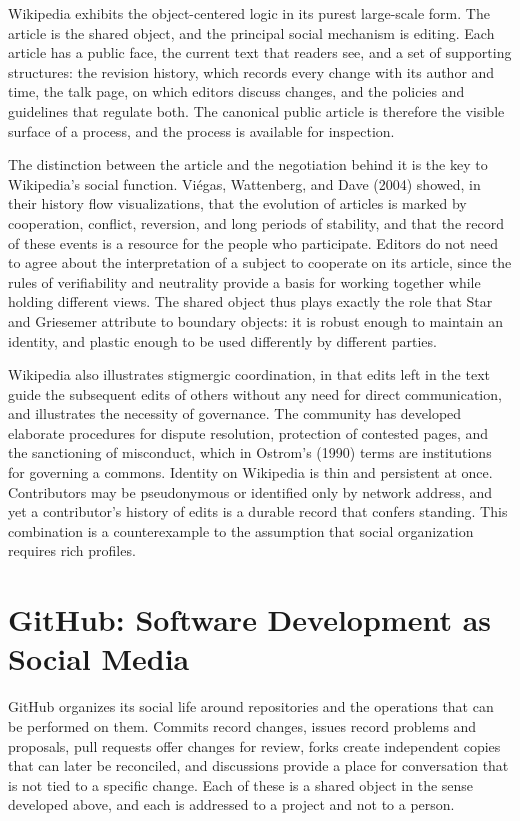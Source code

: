 \documentclass[11pt]{article}
\theoremstyle{remark}
\begin{document}
Wikipedia exhibits the object-centered logic in its purest large-scale form. The article is the shared object, and the principal social mechanism is editing. Each article has a public face, the current text that readers see, and a set of supporting structures: the revision history, which records every change with its author and time, the talk page, on which editors discuss changes, and the policies and guidelines that regulate both. The canonical public article is therefore the visible surface of a process, and the process is available for inspection.

The distinction between the article and the negotiation behind it is the key to Wikipedia's social function. Viégas, Wattenberg, and Dave (2004) showed, in their history flow visualizations, that the evolution of articles is marked by cooperation, conflict, reversion, and long periods of stability, and that the record of these events is a resource for the people who participate. Editors do not need to agree about the interpretation of a subject to cooperate on its article, since the rules of verifiability and neutrality provide a basis for working together while holding different views. The shared object thus plays exactly the role that Star and Griesemer attribute to boundary objects: it is robust enough to maintain an identity, and plastic enough to be used differently by different parties.

Wikipedia also illustrates stigmergic coordination, in that edits left in the text guide the subsequent edits of others without any need for direct communication, and illustrates the necessity of governance. The community has developed elaborate procedures for dispute resolution, protection of contested pages, and the sanctioning of misconduct, which in Ostrom's (1990) terms are institutions for governing a commons. Identity on Wikipedia is thin and persistent at once. Contributors may be pseudonymous or identified only by network address, and yet a contributor's history of edits is a durable record that confers standing. This combination is a counterexample to the assumption that social organization requires rich profiles.

\section{GitHub: Software Development as Social Media}

GitHub organizes its social life around repositories and the operations that can be performed on them. Commits record changes, issues record problems and proposals, pull requests offer changes for review, forks create independent copies that can later be reconciled, and discussions provide a place for conversation that is not tied to a specific change. Each of these is a shared object in the sense developed above, and each is addressed to a project and not to a person.
\end{document}
